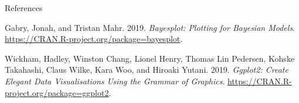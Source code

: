 \documentclass[12pt,ignorenonframetext,aspectratio=169]{beamer}
\begin{document}
\begin{frame}{References}
\protect\hypertarget{references}{}

\hypertarget{refs}{}
\leavevmode\hypertarget{ref-R-bayesplot}{}%
Gabry, Jonah, and Tristan Mahr. 2019. \emph{Bayesplot: Plotting for Bayesian Models}. \url{https://CRAN.R-project.org/package=bayesplot}.

\leavevmode\hypertarget{ref-R-ggplot2}{}%
Wickham, Hadley, Winston Chang, Lionel Henry, Thomas Lin Pedersen, Kohske Takahashi, Claus Wilke, Kara Woo, and Hiroaki Yutani. 2019. \emph{Ggplot2: Create Elegant Data Visualisations Using the Grammar of Graphics}. \url{https://CRAN.R-project.org/package=ggplot2}.

\end{frame}
\end{document}
